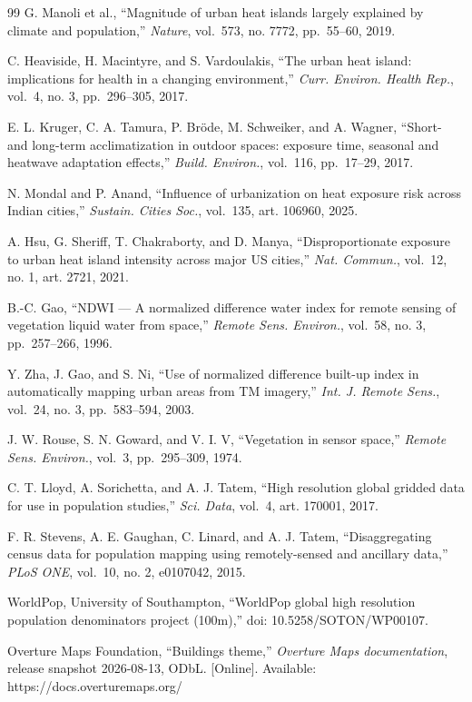 \documentclass[conference]{IEEEtran}
\begin{document}
\begin{thebibliography}{99}
 G. Manoli et al., ``Magnitude of urban heat islands largely explained by climate and population,''
\emph{Nature}, vol.~573, no. 7772, pp.~55--60, 2019.


 C. Heaviside, H. Macintyre, and S. Vardoulakis, ``The urban heat island: implications for health in
a changing environment,'' \emph{Curr. Environ. Health Rep.}, vol.~4, no. 3, pp.~296--305, 2017.


 E. L. Kruger, C. A. Tamura, P. Bröde, M. Schweiker, and A. Wagner, ``Short- and long-term
acclimatization in outdoor spaces: exposure time, seasonal and heatwave adaptation effects,'' \emph{Build.
Environ.}, vol.~116, pp.~17--29, 2017.


 N. Mondal and P. Anand, ``Influence of urbanization on heat exposure risk across Indian cities,''
\emph{Sustain. Cities Soc.}, vol.~135, art. 106960, 2025.


 A. Hsu, G. Sheriff, T. Chakraborty, and D. Manya, ``Disproportionate exposure to urban heat island
intensity across major US cities,'' \emph{Nat. Commun.}, vol.~12, no. 1, art. 2721, 2021.


 B.-C. Gao, ``NDWI --- A normalized difference water index for remote sensing of vegetation liquid
water from space,'' \emph{Remote Sens. Environ.}, vol.~58, no. 3, pp.~257--266, 1996.


 Y. Zha, J. Gao, and S. Ni, ``Use of normalized difference built-up index in automatically mapping
urban areas from TM imagery,'' \emph{Int. J. Remote Sens.}, vol.~24, no. 3, pp.~583--594, 2003.


 J. W. Rouse, S. N. Goward, and V. I. V, ``Vegetation in sensor space,'' \emph{Remote Sens. Environ.},
vol.~3, pp.~295--309, 1974.


 C. T. Lloyd, A. Sorichetta, and A. J. Tatem, ``High resolution global gridded data for use in
population studies,'' \emph{Sci. Data}, vol.~4, art. 170001, 2017.


 F. R. Stevens, A. E. Gaughan, C. Linard, and A. J. Tatem, ``Disaggregating census data for
population mapping using remotely-sensed and ancillary data,'' \emph{PLoS ONE}, vol.~10, no. 2, e0107042,
2015.


 WorldPop, University of Southampton, ``WorldPop global high resolution population denominators
project (100m),'' doi: 10.5258/SOTON/WP00107.


 Overture Maps Foundation, ``Buildings theme,'' \emph{Overture Maps documentation}, release snapshot
2026-08-13, ODbL. {[}Online{]}. Available: https://docs.overturemaps.org/



\end{thebibliography}
\end{document}
